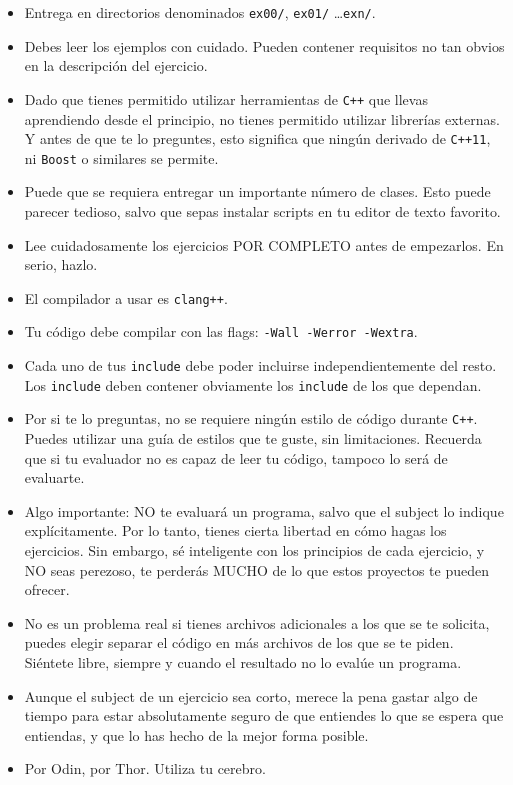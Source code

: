 \begin{itemize}
  \item Entrega en directorios denominados \texttt{ex00/}, \texttt{ex01/}
    \ldots\texttt{exn/}.

  \item Debes leer los ejemplos con cuidado. Pueden contener requisitos no
    tan obvios en la descripción del ejercicio.

  \item Dado que tienes permitido utilizar herramientas de \texttt{C++}
    que llevas aprendiendo desde el principio, no tienes permitido utilizar
    librerías externas. Y antes de que te lo preguntes, esto significa
    que ningún derivado de \texttt{C++11}, ni \texttt{Boost} o similares
    se permite.

  \item Puede que se requiera entregar un importante número de clases. Esto
    puede parecer tedioso, salvo que sepas instalar scripts en tu editor
    de texto favorito.

  \item Lee cuidadosamente los ejercicios POR COMPLETO antes de empezarlos.
    En serio, hazlo.

  \item El compilador a usar es \texttt{clang++}.

  \item Tu código debe compilar con las flags: \texttt{-Wall -Werror -Wextra}.

  \item Cada uno de tus \texttt{include} debe poder incluirse
    independientemente del resto. Los \texttt{include} deben contener
    obviamente los \texttt{include} de los que dependan.

  \item Por si te lo preguntas, no se requiere ningún estilo de código durante
    \texttt{C++}. Puedes utilizar una guía de estilos que te guste, sin
    limitaciones. Recuerda que si tu evaluador no es capaz de leer tu código,
    tampoco lo será de evaluarte.

  \item Algo importante: NO te evaluará un programa, salvo que el subject
    lo indique explícitamente. Por lo tanto, tienes cierta libertad en cómo
    hagas los ejercicios. Sin embargo, sé inteligente con los principios
    de cada ejercicio, y NO seas perezoso, te perderás MUCHO de lo que
    estos proyectos te pueden ofrecer.

  \item No es un problema real si tienes archivos adicionales a los que
    se te solicita, puedes elegir separar el código en más archivos de los
    que se te piden. Siéntete libre, siempre y cuando el resultado
    no lo evalúe un programa.

  \item Aunque el subject de un ejercicio sea corto, merece la pena gastar
    algo de tiempo para estar absolutamente seguro de que entiendes lo que
    se espera que entiendas, y que lo has hecho de la mejor forma posible.

  \item Por Odin, por Thor. Utiliza tu cerebro.

\end{itemize}

\newpage
